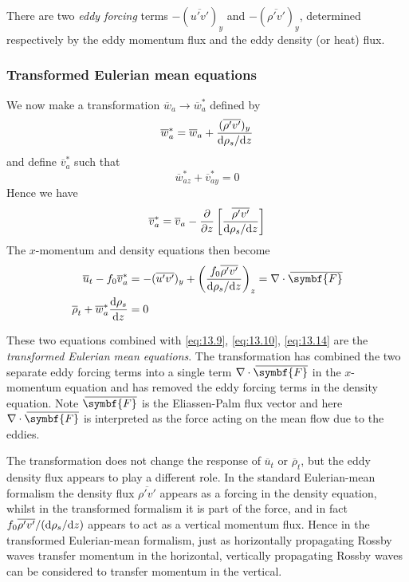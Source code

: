 \documentclass{jknotes}
\newcommand{\myol}[2][3]{{}\mkern#1mu\overline{\mkern-#1mu#2}}
\begin{document}
There are two \emph{eddy forcing} terms $-(\overline{u'v'})_y$ and
$-(\overline{\rho'v'})_y$, determined respectively by the eddy momentum flux
and the eddy density (or heat) flux. 

\subsubsection{Transformed Eulerian mean equations}
We now make a transformation $\overline{w}_a \to \overline{w}_a^*$ defined by
\begin{equation}
	\overline{w}_a^* = \overline{w}_a + \frac{(\overline{\rho' v'})_y}{\diffd
	\rho_s / \diffd z}
\end{equation}
and define $\overline{v}_a^*$ such that 
\begin{equation}
	\overline{w}_{az}^* + \overline{v}_{ay}^* = 0 \label{eq:13.14}
\end{equation}
Hence we have
\begin{equation}
	\overline{v}_a^* = \overline{v}_a - \frac{\partial}{\partial z} \left[
	\frac{\overline{\rho' v'}}{\diffd \rho_s/\diffd z}\right]
\end{equation}
The $x$-momentum and density equations then become
\begin{align}
	\overline{u}_t - f_0 \overline{v}_a^* &= -(\overline{u'v'})_y + \left(
	\frac{f_0 \overline{\rho'v'}}{\diffd \rho_s/\diffd z}\right)_z = \nabla
	\cdot \myol[4]{\symbf{F}} \label{eq:13.16}\\
	\overline{\rho}_t + \overline{w}_a^* \frac{\diffd \rho_s}{\diffd z} &=
	0\label{eq:13.17}
\end{align}

These two equations combined with \eqref{eq:13.9}, \eqref{eq:13.10},
\eqref{eq:13.14} are the \emph{transformed Eulerian mean equations}. The
transformation has combined the two separate eddy forcing terms into a single
term $\nabla \cdot \myol[4]{\symbf{F}}$ in the $x$-momentum equation and has
removed the eddy forcing terms in the density equation. Note
$\myol[4]{\symbf{F}}$ is the Eliassen-Palm flux vector and here $\nabla \cdot
\myol[4]{\symbf{F}}$ is interpreted as the force acting on the mean flow due
to the eddies. 

The transformation does not change the response of $\overline{u}_t$ or
$\overline{\rho}_t$, but the eddy density flux appears to play a different
role. In the standard Eulerian-mean formalism the density flux
$\overline{\rho'v'}$ appears as a forcing in the density equation, whilst in
the transformed formalism it is part of the force, and in fact $f_0
\overline{\rho'v'}/(\diffd \rho_s/\diffd z)$ appears to act as a vertical
momentum flux. Hence in the transformed Eulerian-mean formalism, just as
horizontally propagating Rossby waves transfer momentum in the horizontal,
vertically propagating Rossby waves can be considered to transfer momentum in
the vertical.
\end{document}

